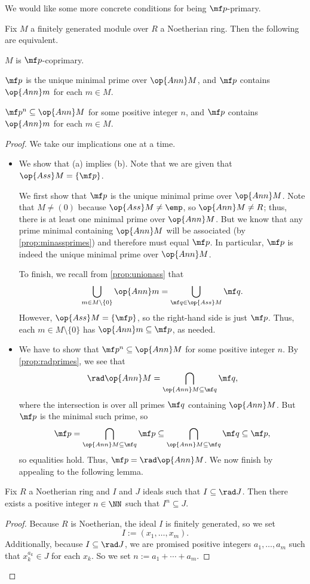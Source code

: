 \documentclass[../notes.tex]{subfiles}
\begin{document}
We would like some more concrete conditions for being $\mf p$-primary.
\begin{proposition}
	Fix $M$ a finitely generated module over $R$ a Noetherian ring. Then the following are equivalent.
	\begin{listalph}
		\item $M$ is $\mf p$-coprimary.
		\item $\mf p$ is the unique minimal prime over $\op{Ann}M$, and $\mf p$ contains $\op{Ann}m$ for each $m\in M$. %
		\item $\mf p^n\subseteq\op{Ann}M$ for some positive integer $n$, and $\mf p$ contains $\op{Ann}m$ for each $m\in M$.
	\end{listalph}
\end{proposition}
\begin{proof}
	We take our implications one at a time.
	\begin{itemize}
		\item We show that (a) implies (b). Note that we are given that $\op{Ass}M=\{\mf p\}$.
		
		We first show that $\mf p$ is the unique minimal prime over $\op{Ann}M$. Note that $M\ne(0)$ because $\op{Ass}M\ne\emp$, so $\op{Ann}M\ne R$; thus, there is at least one minimal prime over $\op{Ann}M$. But we know that any prime minimal containing $\op{Ann}M$ will be associated (by \autoref{prop:minassprimes}) and therefore must equal $\mf p$. In particular, $\mf p$ is indeed the unique minimal prime over $\op{Ann}M$.

		To finish, we recall from \autoref{prop:unionass} that
		\[\bigcup_{m\in M\setminus\{0\}}\op{Ann}m=\bigcup_{\mf q\in\op{Ass}M}\mf q.\]
		However, $\op{Ass}M=\{\mf p\}$, so the right-hand side is just $\mf p$. Thus, each $m\in M\setminus\{0\}$ has $\op{Ann}m\subseteq\mf p$, as needed.

		\item We have to show that $\mf p^n\subseteq\op{Ann}M$ for some positive integer $n$. By \autoref{prop:radprimes}, we see that
		\[\rad\op{Ann}M=\bigcap_{\op{Ann}M\subseteq\mf q}\mf q,\]
		where the intersection is over all primes $\mf q$ containing $\op{Ann}M$. But $\mf p$ is the minimal such prime, so
		\[\mf p=\bigcap_{\op{Ann}M\subseteq\mf q}\mf p\subseteq\bigcap_{\op{Ann}M\subseteq\mf q}\mf q\subseteq\mf p,\]
		so equalities hold. Thus, $\mf p=\rad\op{Ann}M$. We now finish by appealing to the following lemma.
	\end{itemize}
	\begin{lemma}
		Fix $R$ a Noetherian ring and $I$ and $J$ ideals such that $I\subseteq\rad J$. Then there exists a positive integer $n\in\NN$ such that $I^n\subseteq J$.
	\end{lemma}
	\begin{proof}
		Because $R$ is Noetherian, the ideal $I$ is finitely generated, so we set
		\[I:=(x_1,\ldots,x_m).\]
		Additionally, because $I\subseteq\rad J$, we are promised positive integers $a_1,\ldots,a_m$ such that $x_k^{a_k}\in J$ for each $x_k$. So we set $n:=a_1+\cdots+a_m$.
		

\end{proof}
\end{proof}
\end{document}
